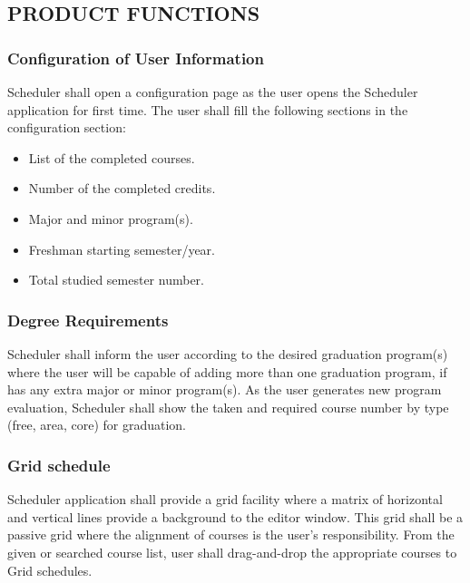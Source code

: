 \documentclass[twoside,letterpaper]{article}
\begin{document}
\subsection[PRODUCT
FUNCTIONS]{\rmfamily\bfseries\color{black}
PRODUCT FUNCTIONS}

\subsubsection[Configuration of User Information
]{\rmfamily\bfseries\color{black}
	Configuration of User Information}

{\color{black}
	Scheduler shall open a configuration page as the user opens the Scheduler application for first time. The user shall fill the following sections in the configuration section:}

\begin{itemize}
	\item List of the completed courses.
	\item Number of the completed credits.
	\item Major and minor program(s).
	\item Freshman starting semester/year.
	\item Total studied semester number.	
\end{itemize}

\subsubsection[Degree Requirements
]{\rmfamily\bfseries\color{black}
	Degree Requirements}

{\color{black}
	Scheduler shall inform the user according to the desired graduation program(s) where the user will be capable of adding more than one graduation program, if has any extra major or minor program(s). As the user generates new program evaluation, Scheduler shall show the taken and required course number by type (free, area, core) for graduation.}

\subsubsection[Grid schedules
]{\rmfamily\bfseries\color{black}
Grid schedule}

{\color{black}
Scheduler application shall provide a grid facility where a matrix of horizontal and vertical lines provide a background to the editor window. This grid shall be a passive grid where the alignment of courses is the user's responsibility. From the given or searched course list, user shall drag-and-drop the appropriate courses to Grid schedules. }
	
\end{document}
